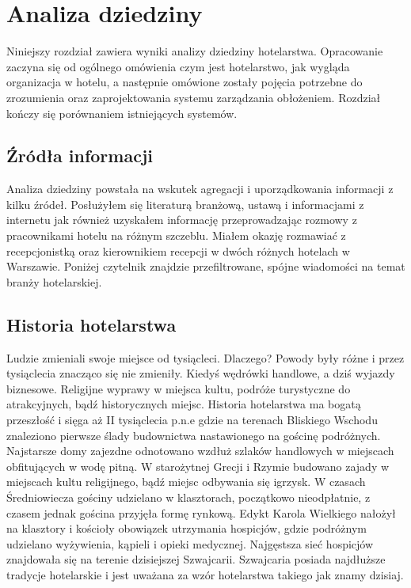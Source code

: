 \documentclass[a4paper,onecolumn,oneside,11pt,wide,floatssmall]{mwrep}
\theoremstyle{definition}
\theoremstyle{plain}%
\theoremstyle{remark}
\begin{document}
\chapter{Analiza dziedziny} 
\label{analiza-dziedziny}
Niniejszy rozdział zawiera wyniki analizy dziedziny hotelarstwa. Opracowanie zaczyna się od ogólnego omówienia czym jest hotelarstwo, jak wygląda organizacja w hotelu, a następnie omówione zostały pojęcia potrzebne do zrozumienia oraz zaprojektowania systemu zarządzania obłożeniem. Rozdział kończy się porównaniem istniejących systemów.

\section{Źródła informacji}

Analiza dziedziny powstała na wskutek agregacji i uporządkowania informacji 
z kilku źródeł. Posłużyłem się literaturą branżową, ustawą i informacjami z 
internetu jak również uzyskałem informację przeprowadzając rozmowy z 
pracownikami hotelu na różnym szczeblu. Miałem okazję rozmawiać z 
recepcjonistką oraz kierownikiem recepcji w dwóch różnych hotelach w 
Warszawie. Poniżej czytelnik znajdzie przefiltrowane, spójne wiadomości na
 temat branży hotelarskiej.


\section{Historia hotelarstwa} 

Ludzie zmieniali swoje miejsce od tysiącleci. Dlaczego? Powody były różne i 
przez tysiąclecia znacząco się nie zmieniły. Kiedyś wędrówki handlowe, a 
dziś wyjazdy biznesowe. Religijne wyprawy w miejsca kultu, podróże 
turystyczne do atrakcyjnych, bądź historycznych miejsc.     Historia 
hotelarstwa ma bogatą przeszłość i sięga aż II tysiąclecia p.n.e gdzie na 
terenach Bliskiego Wschodu znaleziono pierwsze ślady budownictwa 
nastawionego na gościnę podróżnych. Najstarsze domy zajezdne odnotowano 
wzdłuż szlaków handlowych w miejscach obfitujących w wodę pitną. W 
starożytnej Grecji i Rzymie budowano zajady w miejscach kultu religijnego, 
bądź miejsc odbywania się igrzysk. W czasach Średniowiecza gościny udzielano 
w klasztorach, początkowo nieodpłatnie, z czasem jednak gościna przyjęła 
formę rynkową. Edykt Karola Wielkiego nałożył na klasztory i kościoły 
obowiązek utrzymania hospicjów, gdzie podróżnym udzielano wyżywienia, 
kąpieli i opieki medycznej. Najgęstsza sieć hospicjów znajdowała się na 
terenie dzisiejszej Szwajcarii. Szwajcaria posiada najdłuższe tradycje 
hotelarskie i jest uważana za wzór hotelarstwa takiego jak znamy dzisiaj.
\end{document}
